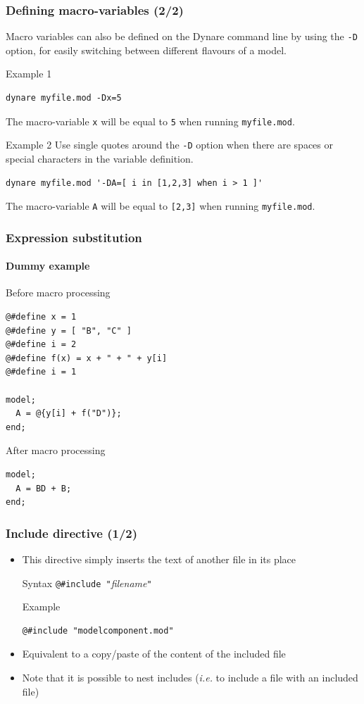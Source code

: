 \documentclass[aspectratio=169]{beamer}
\begin{document}
\begin{frame}[fragile=singleslide]
  \frametitle{Defining macro-variables (2/2)}
  Macro variables can also be defined on the Dynare command line by using the
  \texttt{-D} option, for easily switching between different flavours of a model.

  \begin{block}{Example 1}
\begin{verbatim}
dynare myfile.mod -Dx=5
\end{verbatim}
The macro-variable \texttt{x} will be equal to \texttt{5} when running \texttt{myfile.mod}.
\end{block}

\begin{block}{Example 2}
  Use single quotes around the \texttt{-D} option when there are spaces or
  special characters in the variable definition.
\begin{verbatim}
dynare myfile.mod '-DA=[ i in [1,2,3] when i > 1 ]'
\end{verbatim}
The macro-variable \texttt{A} will be equal to \texttt{[2,3]} when running \texttt{myfile.mod}.
\end{block}
\end{frame}


\begin{frame}[fragile=singleslide]
  \frametitle{Expression substitution}
  \framesubtitle{Dummy example}
  \begin{block}{Before macro processing}
\begin{verbatim}
@#define x = 1
@#define y = [ "B", "C" ]
@#define i = 2
@#define f(x) = x + " + " + y[i]
@#define i = 1

model;
  A = @{y[i] + f("D")};
end;
\end{verbatim}
  \end{block}
  \begin{block}{After macro processing}
\begin{verbatim}
model;
  A = BD + B;
end;
\end{verbatim}
  \end{block}
\end{frame}

\begin{frame}[fragile=singleslide]
  \frametitle{Include directive (1/2)}
  \begin{itemize}
  \item This directive simply inserts the text of another file in its place
    \begin{block}{Syntax}
      \verb+@#include "+\textit{filename}\verb+"+
    \end{block}
    \begin{block}{Example}
\begin{verbatim}
@#include "modelcomponent.mod"
\end{verbatim}
    \end{block}
  \item Equivalent to a copy/paste of the content of the included file
  \item Note that it is possible to nest includes (\textit{i.e.} to include a
    file with an included file)
  \end{itemize}
\end{frame}
\end{document}
